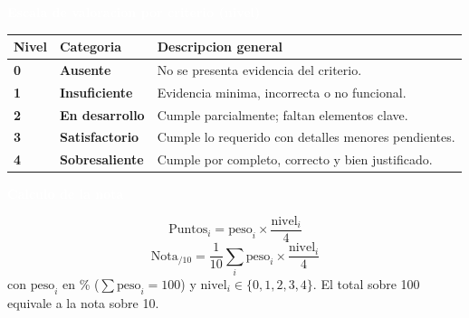 \documentclass[10pt]{article}
\newcommand{\dimtitulo}[1]{%
\vspace{4pt}\begin{tcolorbox}[colback=azulMedio,colframe=azulMedio,boxrule=0pt,arc=1pt,left=6pt,right=6pt,top=3pt,bottom=3pt]
\textcolor{white}{\textbf{#1}}\end{tcolorbox}\vspace{-2pt}}
\begin{document}
\vspace{2pt}
\noindent
\begin{minipage}[t]{0.62\textwidth}
\dimtitulo{Escala de valoracion por criterio (nivel)}
\footnotesize
\begin{tabularx}{\linewidth}{>{\centering\arraybackslash\bfseries}p{1.1cm}>{\bfseries}p{3.0cm}Y}
\toprule
{} Nivel & Categoria & Descripcion general \\  & Ausente & No se presenta evidencia del criterio. \\
1 & Insuficiente & Evidencia minima, incorrecta o no funcional. \\
2 & En desarrollo & Cumple parcialmente; faltan elementos clave. \\
3 & Satisfactorio & Cumple lo requerido con detalles menores pendientes. \\
4 & Sobresaliente & Cumple por completo, correcto y bien justificado. \\ \bottomrule
\end{tabularx}
\end{minipage}\hfill
\begin{minipage}[t]{0.35\textwidth}
\dimtitulo{Calculo de la nota}
\begin{tcolorbox}[colback=white,colframe=tealUteq,boxrule=0.8pt,arc=2pt,left=6pt,right=6pt,top=5pt,bottom=5pt]
\footnotesize
\[ \text{Puntos}_{i} = \text{peso}_{i}\times \frac{\text{nivel}_{i}}{4} \]
\[ \text{Nota}_{/10} = \frac{1}{10}\sum_{i} \text{peso}_{i}\times \frac{\text{nivel}_{i}}{4} \]
con $\text{peso}_i$ en \% ($\sum \text{peso}_i = 100$) y $\text{nivel}_i \in \{0,1,2,3,4\}$. El total sobre 100 equivale a la nota sobre 10.
\end{tcolorbox}
\end{minipage}
\end{document}
